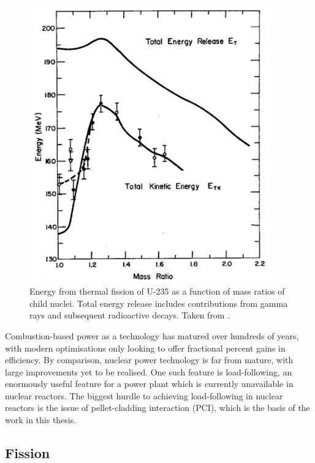 \begin{figure}[htp]
\centering
\includegraphics[height=12cm]{images/fission_energy_total.png}
\caption[Energy from thermal fission of U-235 as a function of mass ratios of child nuclei. Total energy release includes contributions from gamma rays and subsequent radioactive decays.]{Energy from thermal fission of U-235 as a function of mass ratios of child nuclei. Total energy release includes contributions from gamma rays and subsequent radioactive decays. Taken from \cite{aras1965ranges}.}
\label{figure:fissionenergy}
\end{figure}

Combustion-based power as a technology has matured over hundreds of years, with modern optimisations only looking to offer fractional percent gains in efficiency. By comparison, nuclear power technology is far from mature, with large improvements yet to be realised. One such feature is load-following, an enormously useful feature for a power plant which is currently unavailable in nuclear reactors. The biggest hurdle to achieving load-following in nuclear reactors is the issue of pellet-cladding interaction (PCI), which is the basis of the work in this thesis.

\subsection{Fission} %

